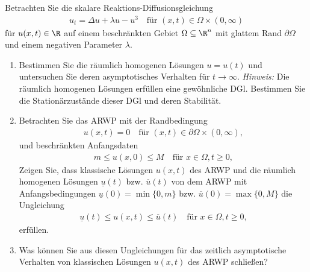 
\begin{exercise}

\phantom{}
	Betrachten Sie die skalare Reaktions-Diffusionsgleichung
	\begin{align*}
		u_t = \Delta u + \lambda u - u^3 \quad \text{für } (x,t) \in \Omega \times (0, \infty)
	\end{align*}
	für $u(x,t) \in \R$ auf einem beschränkten Gebiet $\Omega \subseteq \R^n$ mit glattem Rand $\partial \Omega$ und einem negativen Parameter $\lambda$.
	\begin{enumerate}[label = (\roman*)]
		\item Bestimmen Sie die räumlich homogenen Lösungen $u = u(t)$ und untersuchen Sie deren asymptotisches Verhalten für $t \to \infty$. \newline
		\textit{Hinweis:} Die räumlich homogenen Lösungen erfüllen eine gewöhnliche DGl. Bestimmen Sie die Stationärzustände dieser DGl und deren Stabilität.

		\item Betrachten Sie das ARWP mit der Randbedingung
		\begin{align*}
			u(x,t) = 0 \quad \text{für } (x,t) \in \partial \Omega \times (0, \infty),
		\end{align*}
		und beschränkten Anfangsdaten
		\begin{align*}
			m \leq u(x,0) \leq M \quad \text{für }  x \in \Omega, t \geq 0,
		\end{align*}
		Zeigen Sie, dass klassische Lösungen $u(x,t)$ des ARWP und die räumlich homogenen Lösungen $\underline{u}(t)$ bzw. $\overline{u}(t)$ von dem ARWP mit Anfangsbedingungen $\underline{u}(0) = \min\{0, m\}$ bzw. $\overline{u}(0) = \max\{0, M\}$ die Ungleichung
		\begin{align*}
			\underline{u}(t) \leq u(x,t) \leq \overline{u}(t) \quad \text{für } x \in \Omega, t \geq 0,
		\end{align*}
		erfüllen.

		\item Was können Sie aus diesen Ungleichungen für das zeitlich asymptotische Verhalten von klassischen Lösungen $u(x,t)$ des ARWP schließen?
	\end{enumerate}
\end{exercise}


